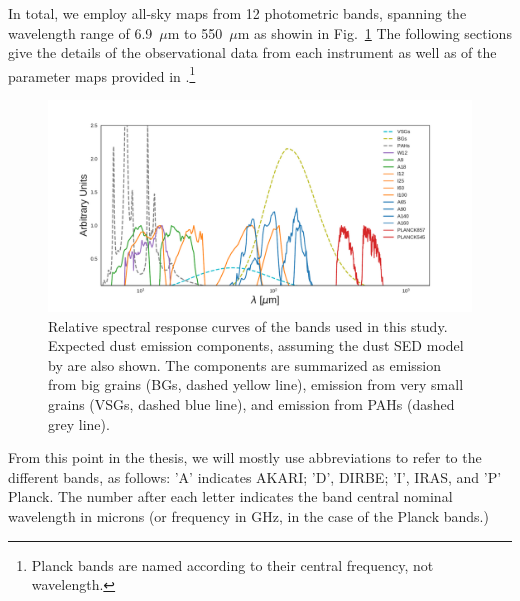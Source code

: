     In total, we employ all-sky maps from 12 photometric bands, spanning the wavelength range of 6.9~$\mu$m to 550~$\mu$m as showin in Fig.~\ref{fig:Filter_coverage_example_full} The following sections give the details of the observational data from each instrument as well as of the parameter maps provided in \cite{planck15X}.\footnote{Planck bands are named according to their central frequency, not wavelength.}
      \begin{figure}
        \centering
        \includegraphics[width=\textwidth]{../Plots/ch_datasources/Filter_coverage_example_full.pdf}
        \caption{Relative spectral response curves of the bands used in this study. Expected dust emission components, assuming the dust SED model by \citep{dustem11} are also shown. The components are summarized as emission from big grains (BGs, dashed yellow line), emission from very small grains (VSGs, dashed blue line), and emission from PAHs (dashed grey line).}
        \label{fig:Filter_coverage_example_full}
      \end{figure}
    From this point in the thesis, we will mostly use abbreviations to refer to the different bands, as follows: 'A' indicates AKARI; 'D', DIRBE; 'I', IRAS, and 'P' Planck. The number after each letter indicates the band central nominal wavelength in microns (or frequency in GHz, in the case of the Planck bands.)
